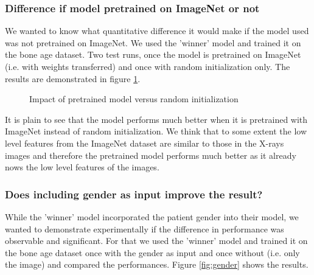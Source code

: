 \documentclass[10pt,twocolumn,letterpaper]{article}
\begin{document}
\subsubsection{Difference if model pretrained on ImageNet or not}
We wanted to know what quantitative difference it would make if the model used was not pretrained on ImageNet.  We used the 'winner' model and trained it on the bone age dataset. Two test runs, once the model is pretrained on ImageNet (i.e. with weights transferred) and once with random initialization only. The results are demonstrated in figure \ref{fig:pretrained}.

\begin{figure}[H]
    \centering
\caption{Impact of pretrained model versus random initialization}
\label{fig:pretrained}
\end{figure}

It is plain to see that the model performs much better when it is pretrained with ImageNet instead of random initialization. We think that to some extent the low level features from the ImageNet dataset are similar to those in the X-rays images and therefore the pretrained model performs much better as it already nows the low level features of the images.

\subsubsection{Does including gender as input improve the result?}
While the 'winner' model incorporated the patient gender into their model, we wanted to demonstrate experimentally if the difference in performance was observable and significant. For that we used the 'winner' model and trained it on the bone age dataset once with the gender as input and once without (i.e. only the image) and compared the performances. Figure \ref{fig:gender} shows the results.
\end{document}
